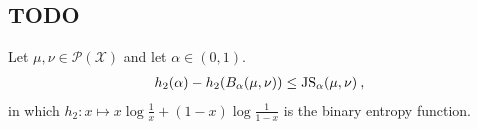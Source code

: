 \subsection{TODO}


\begin{lemma}
  \label{lem:sub_bayesBinaryRisk_le_jensenShannon}
  Let $\mu, \nu \in \mathcal P(\mathcal X)$ and let $\alpha \in (0, 1)$.
  \begin{align*}
  h_2(\alpha) - h_2(B_\alpha(\mu, \nu)) \le \operatorname{JS}_\alpha(\mu, \nu) \: ,
  \end{align*}
  in which $h_2: x \mapsto x\log\frac{1}{x} + (1 - x)\log\frac{1}{1 - x}$ is the binary entropy function.
\end{lemma}

